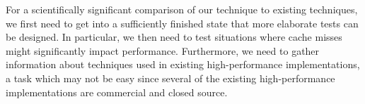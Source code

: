For a scientifically significant comparison of our technique to
existing techniques, we first need to get \sicl{} into a sufficiently
finished state that more elaborate tests can be designed.  In
particular, we then need to test situations where cache misses might
significantly impact performance.  Furthermore, we need to gather
information about techniques used in existing high-performance
implementations, a task which may not be easy since several of the
existing high-performance implementations are commercial and closed
source.
